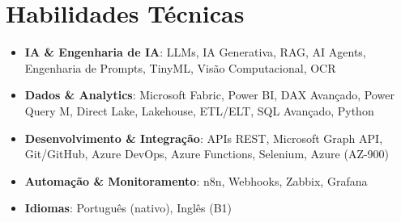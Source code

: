 \documentclass[letterpaper,11pt]{article}
\newcommand{\resumeSubHeadingListStart}{\begin{itemize}[leftmargin=*]}
\newcommand{\resumeSubHeadingListEnd}{\end{itemize}}
\begin{document}
\section{Habilidades Técnicas}
  \resumeSubHeadingListStart
    \item{
      \textbf{IA \& Engenharia de IA}{: LLMs, IA Generativa, RAG, AI Agents, Engenharia de Prompts, TinyML, Visão Computacional, OCR}
    }
    \item{
      \textbf{Dados \& Analytics}{: Microsoft Fabric, Power BI, DAX Avançado, Power Query M, Direct Lake, Lakehouse, ETL/ELT, SQL Avançado, Python}
    }
    \item{
      \textbf{Desenvolvimento \& Integração}{: APIs REST, Microsoft Graph API, Git/GitHub, Azure DevOps, Azure Functions, Selenium, Azure (AZ-900)}
    }
    \item{
      \textbf{Automação \& Monitoramento}{: n8n, Webhooks, Zabbix, Grafana}
    }
    \item{
      \textbf{Idiomas}{: Português (nativo), Inglês (B1)}
    }
  \resumeSubHeadingListEnd


\end{document}
